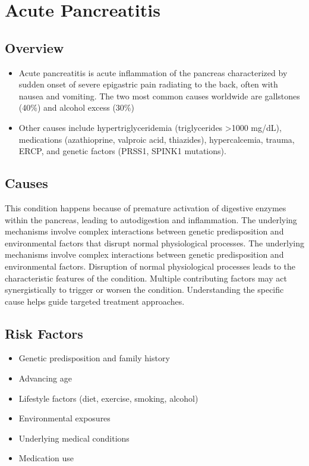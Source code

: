 \chapter{Acute Pancreatitis}
\label{sec:Acute Pancreatitis}

\section{Overview}


\begin{itemize}[noitemsep]
  \item Acute pancreatitis is acute inflammation of the pancreas characterized by sudden onset of severe epigastric pain radiating to the back, often with nausea and vomiting. The two most common causes worldwide are gallstones (40\%) and alcohol excess (30\%)
  \item Other causes include hypertriglyceridemia (triglycerides >1000 mg/dL), medications (azathioprine, valproic acid, thiazides), hypercalcemia, trauma, ERCP, and genetic factors (PRSS1, SPINK1 mutations).
\end{itemize}
\section{Causes}
This condition happens because of premature activation of digestive enzymes within the pancreas, leading to autodigestion and inflammation. The underlying mechanisms involve complex interactions between genetic predisposition and environmental factors that disrupt normal physiological processes. The underlying mechanisms involve complex interactions between genetic predisposition and environmental factors. Disruption of normal physiological processes leads to the characteristic features of the condition. Multiple contributing factors may act synergistically to trigger or worsen the condition. Understanding the specific cause helps guide targeted treatment approaches.
\section{Risk Factors}


\begin{itemize}[noitemsep]
  \item Genetic predisposition and family history
  \item Advancing age
  \item Lifestyle factors (diet, exercise, smoking, alcohol)
  \item Environmental exposures
  \item Underlying medical conditions
  \item Medication use
\end{itemize}
